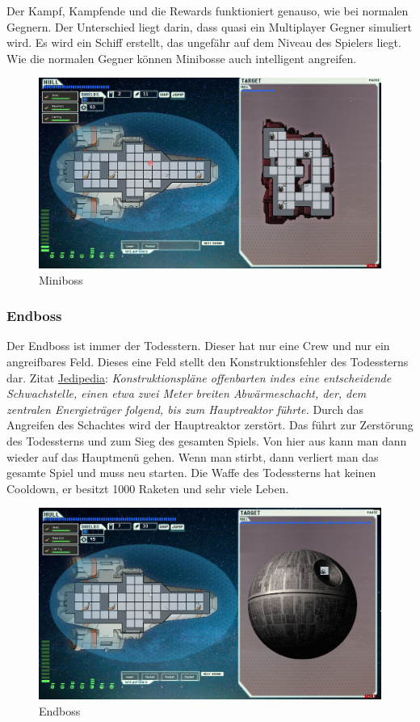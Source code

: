 \documentclass[fontsize=12pt,paper=a4,twoside]{scrartcl}
\begin{document}
Der Kampf, Kampfende und die Rewards funktioniert genauso, wie bei normalen Gegnern. Der Unterschied liegt darin, dass quasi ein Multiplayer Gegner simuliert wird. Es wird ein Schiff erstellt, das ungefähr auf dem Niveau des Spielers liegt. Wie die normalen Gegner können Minibosse auch intelligent angreifen.

\begin{figure}[H]
\centering
\includegraphics[width=1\linewidth]{DasSpiel/Kampf/miniboss.png}
\caption{Miniboss}
\end{figure}

\subsubsection{Endboss}

Der Endboss ist immer der Todesstern. Dieser hat nur eine Crew und nur ein angreifbares Feld. Dieses eine Feld stellt den Konstruktionsfehler des Todessterns dar. Zitat \href{https://jedipedia.fandom.com/wiki/Erster_Todesstern}{Jedipedia}: \textit{\glqq Konstruktionspläne offenbarten indes eine entscheidende Schwachstelle, einen etwa zwei Meter breiten Abwärmeschacht, der, dem zentralen Energieträger folgend, bis zum Hauptreaktor führte.\grqq} Durch das Angreifen des Schachtes wird der Hauptreaktor zerstört. Das führt zur Zerstörung des Todessterns und zum Sieg des gesamten Spiels. Von hier aus kann man dann wieder auf das Hauptmenü gehen. Wenn man stirbt, dann verliert man das gesamte Spiel und muss neu starten. Die Waffe des Todessterns hat keinen Cooldown, er besitzt 1000 Raketen und sehr viele Leben. 

\begin{figure}[H]
\centering
\includegraphics[width=1\linewidth]{DasSpiel/Kampf/endboss.png}
\caption{Endboss}
\end{figure}
\end{document}
